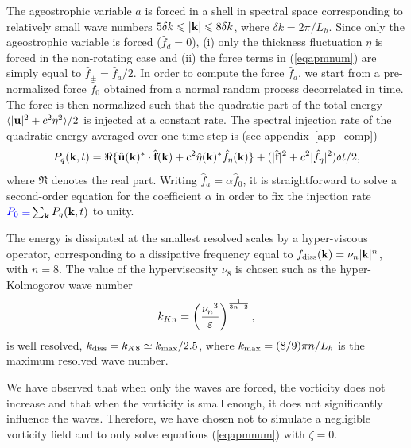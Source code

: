 The ageostrophic variable $a$ is forced in a shell in spectral space
corresponding to relatively small wave numbers $5\delta k\leqslant
|\textbf{k}| \leqslant 8\delta k$, where $\delta k = 2\pi/L_h$.
%
%
Since only the ageostrophic variable is forced ($\hat f_d = 0$),%
(i) only the thickness fluctuation $\eta$ is forced in the
non-rotating case and %
(ii) the force terms in (\ref{eqapmnum}) are simply equal to $\hat
f_\pm = \hat f_a/2$.
%
In order to compute the force $\hat f_a$, we start from a
pre-normalized force $\hat f_{0}$ obtained from a normal random
process decorrelated in time.
%
The force is then normalized such that the quadratic part of the total
energy $\langle|\textbf{u}|^2 + c^2 \eta^2\rangle/2$ is injected at a
constant rate.
%
The spectral injection rate of the quadratic energy averaged over one
time step is (see appendix~\ref{app_comp})
\begin{equation}
P_q(\textbf{k}, t) 
= 
\Re\{ \hat {\textbf{u}}(\textbf{k})^* \cdot \hat {\textbf{f}}(\textbf{k}) 
+
c^2 \hat \eta(\textbf{k})^* \hat f_\eta(\textbf{k}) \}
+ 
(|\hat{\textbf{f}}|^2 + c^2 |\hat f_\eta|^2) \delta t /2,
\end{equation}
where $\Re$ denotes the real part.
%
Writing $\hat f_a = \alpha \hat f_{0}$, it is straightforward to solve
a second-order equation for the coefficient $\alpha$ in order to fix
the injection rate ${\color{blue}P_0 \equiv} \sum_{\textbf{k}} P_q(\textbf{k}, t)$ to unity.


The energy is dissipated at the smallest resolved scales by a
hyper-viscous operator, corresponding to a dissipative frequency equal
to $\fdiss(\kk) = \nu_n |\kk|^n$, with $n = 8$.  The value of the
hyperviscosity $\nu_8$ is chosen such as the hyper-Kolmogorov wave
number
\begin{equation}
k_{Kn} = \left( \frac{{\nu_n}^3}{\varepsilon} \right)^\frac{1}{3n-2},
\end{equation}
is well resolved, $\kdiss =k_{K8} \simeq \kmax/ 2.5$, where $\kmax =
(8/9)\pi n/L_h$ is the maximum resolved wave number.

We have observed that when only the waves are forced, the vorticity
does not increase and that when the vorticity is small enough, it does
not significantly influence the waves.  Therefore, we have chosen not
to simulate a negligible vorticity field and to only solve equations
(\ref{eqapmnum}) with $\zeta = 0$.







